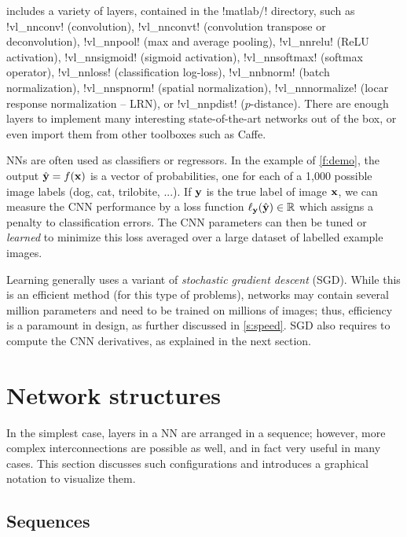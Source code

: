 \matconvnet includes a variety of layers, contained in the !matlab/! directory, such as !vl_nnconv! (convolution), !vl_nnconvt! (convolution transpose or deconvolution), !vl_nnpool! (max and average pooling), !vl_nnrelu! (ReLU activation), !vl_nnsigmoid! (sigmoid activation), !vl_nnsoftmax! (softmax operator), !vl_nnloss! (classification log-loss), !vl_nnbnorm! (batch normalization), !vl_nnspnorm! (spatial normalization), !vl_nnnormalize! (locar response normalization -- LRN), or !vl_nnpdist! ($p$-distance).  There are enough layers to implement many interesting state-of-the-art networks out of the box, or even import them from other toolboxes such as Caffe. 

NNs are often used as classifiers or regressors. In the example of \autoref{f:demo}, the output $\hat {\mathbf{y}} = f(\mathbf{x})$ is a vector of probabilities, one for each of a 1,000 possible image labels (dog, cat, trilobite, ...).  If $\mathbf{y}$ is the true label of image $\mathbf{x}$, we can measure the CNN performance by a loss function $\ell_{\mathbf{y}}(\hat {\mathbf{y}})  \in \mathbb{R}$ which assigns a penalty to classification errors. The CNN parameters can then be tuned or \emph{learned} to minimize this loss averaged over a large dataset of labelled example images.

Learning generally uses a variant of \emph{stochastic gradient descent} (SGD). While this is an efficient method (for this type of problems), networks may contain several million parameters and need to be trained on millions of images; thus, efficiency is a paramount in \matlab design, as further discussed in \autoref{s:speed}. SGD also requires to compute the CNN derivatives, as explained in the next section.

\section{Network structures}\label{s:cnn-topology}

In the simplest case, layers in a NN are arranged in a sequence; however, more complex interconnections are possible as well, and in fact very useful in many cases. This section discusses such configurations and introduces a graphical notation to visualize them.

\subsection{Sequences}\label{s:cnn-simple}

